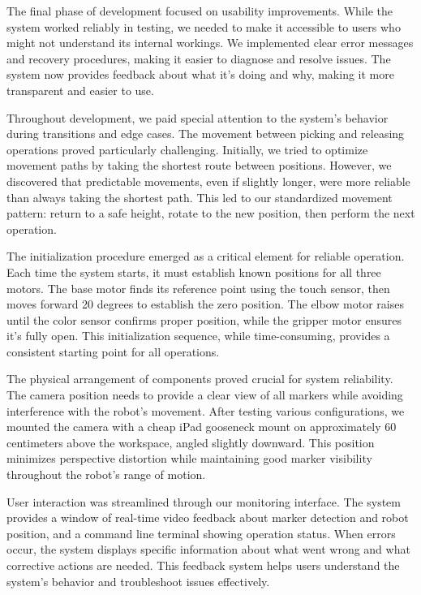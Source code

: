\documentclass[10pt,twocolumn]{article}
\begin{document}
The final phase of development focused on usability improvements. While the system worked reliably in testing, we needed to make it accessible to users who might not understand its internal workings. We implemented clear error messages and recovery procedures, making it easier to diagnose and resolve issues. The system now provides feedback about what it's doing and why, making it more transparent and easier to use.

Throughout development, we paid special attention to the system's behavior during transitions and edge cases. The movement between picking and releasing operations proved particularly challenging. Initially, we tried to optimize movement paths by taking the shortest route between positions. However, we discovered that predictable movements, even if slightly longer, were more reliable than always taking the shortest path. This led to our standardized movement pattern: return to a safe height, rotate to the new position, then perform the next operation.

The initialization procedure emerged as a critical element for reliable operation. Each time the system starts, it must establish known positions for all three motors. The base motor finds its reference point using the touch sensor, then moves forward 20 degrees to establish the zero position. The elbow motor raises until the color sensor confirms proper position, while the gripper motor ensures it's fully open. This initialization sequence, while time-consuming, provides a consistent starting point for all operations.

The physical arrangement of components proved crucial for system reliability. The camera position needs to provide a clear view of all markers while avoiding interference with the robot's movement. After testing various configurations, we mounted the camera with a cheap iPad gooseneck mount on approximately 60 centimeters above the workspace, angled slightly downward. This position minimizes perspective distortion while maintaining good marker visibility throughout the robot's range of motion.

User interaction was streamlined through our monitoring interface. The system provides a window of real-time video feedback about marker detection and robot position, and a command line terminal showing operation status. When errors occur, the system displays specific information about what went wrong and what corrective actions are needed. This feedback system helps users understand the system's behavior and troubleshoot issues effectively.
\end{document}
